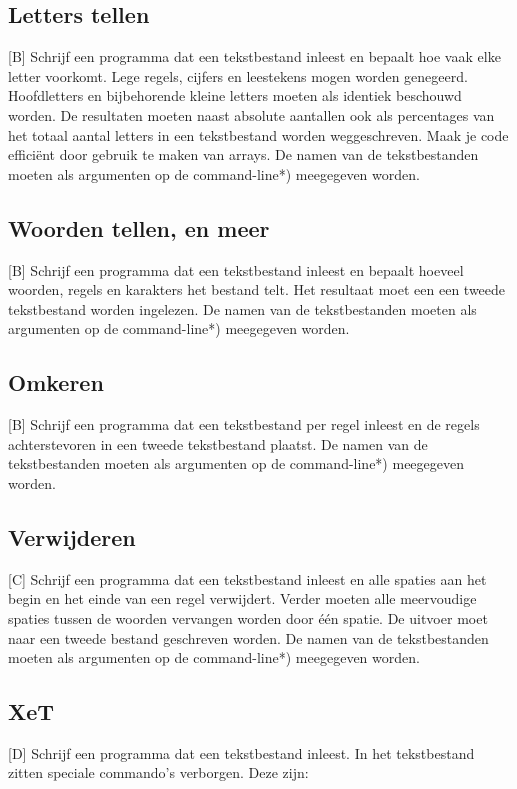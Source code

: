 \documentclass[a4paper,10pt,fleqn,twoside]{article}
\begin{document}
\subsection{Letters tellen}[B]
Schrijf een programma dat een tekstbestand inleest en bepaalt hoe vaak elke letter voorkomt. Lege regels, cijfers en leestekens mogen worden genegeerd. Hoofdletters en bijbehorende kleine letters moeten als identiek beschouwd worden. De resultaten moeten naast absolute aantallen ook als percentages van het totaal aantal letters in een tekstbestand worden weggeschreven. Maak je code efficiënt door gebruik te maken van arrays. De namen van de tekstbestanden moeten als argumenten op de command-line*) meegegeven worden.

\subsection{Woorden tellen, en meer}[B]
Schrijf een programma dat een tekstbestand inleest en bepaalt hoeveel woorden, regels en karakters het bestand telt. Het resultaat moet een een tweede tekstbestand worden ingelezen. De namen van de tekstbestanden moeten als argumenten op de command-line*) meegegeven worden.

\subsection{Omkeren}[B]
Schrijf een programma dat een tekstbestand per regel inleest en de regels achterstevoren in een tweede tekstbestand plaatst. De namen van de tekstbestanden moeten als argumenten op de command-line*) meegegeven worden.

\subsection{Verwijderen}[C]
Schrijf een programma dat een tekstbestand inleest en alle spaties aan het begin en het einde van een regel verwijdert. Verder moeten alle meervoudige spaties tussen de woorden vervangen worden door \'e\'en spatie. De uitvoer moet naar een tweede bestand geschreven worden.
De namen van de tekstbestanden moeten als argumenten op de command-line*) meegegeven worden.

\subsection{XeT}[D]
Schrijf een programma dat een tekstbestand inleest. In het tekstbestand zitten speciale commando's verborgen. Deze zijn:
\end{document}
